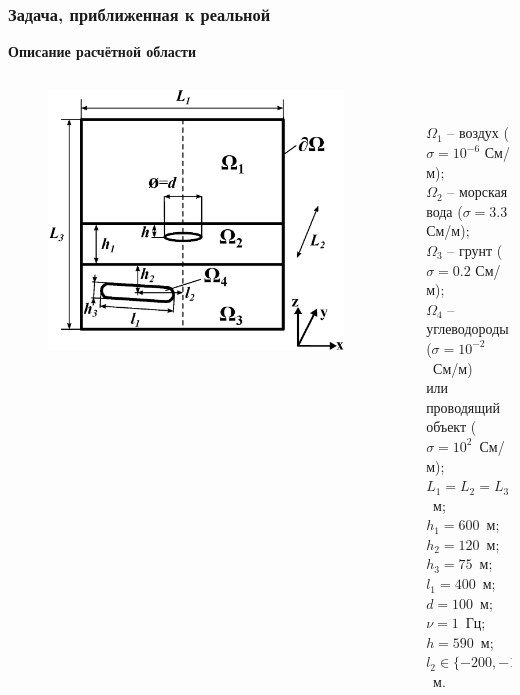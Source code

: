 \documentclass[aspectratio=43,usepdftitle=false]{beamer}
\newcommand{\MakeTitle}[1]{\frametitle{\hspace{1.5em}\textbf{#1} \hfill \insertframenumber{} }}
\begin{document}
\begin{frame}
	\MakeTitle{Задача, приближенная к реальной}
	\textbf{Описание расчётной области}
	\begin{columns}[t,totalwidth=\linewidth]
		\hspace{-0.07\linewidth}
		\begin{column}{.5\linewidth}
			\vspace{-3em}
			\begin{figure}[ht]
				\includegraphics[width=1.1\textwidth,height=1.1\textheight,keepaspectratio]{area_3layers_shift_3_waterloop.eps}
			\end{figure}
		\end{column}
		\begin{column}{.04\linewidth}
		\end{column}
		\begin{column}{.8\linewidth}
			\\
			\begin{small}
			$\Omega_1$ -- воздух ($\sigma=10^{-6}$ См/м); \\
			$\Omega_2$ -- морская вода ($\sigma=3.3$ См/м); \\
			$\Omega_3$ -- грунт ($\sigma=0.2$ См/м); \\
			$\Omega_4$ -- углеводороды ($\sigma=10^{-2}$~См/м) \\
			или проводящий объект ($\sigma=10^{2}$~См/м); \\
			$L_1 = L_2 = L_3 = 6000$~м; \\
			$h_1=600$~м; $h_2=120$~м; \\
			$h_3=75$~м; $l_1=400$~м; \\
			$d=100$~м; $\nu=1$~Гц; $h=590$~м; \\
			$l_2 \in \{ -200, -100, 0 \}$~м.
			\end{small}
		\end{column}
	\end{columns}
\end{frame}
\end{document}
